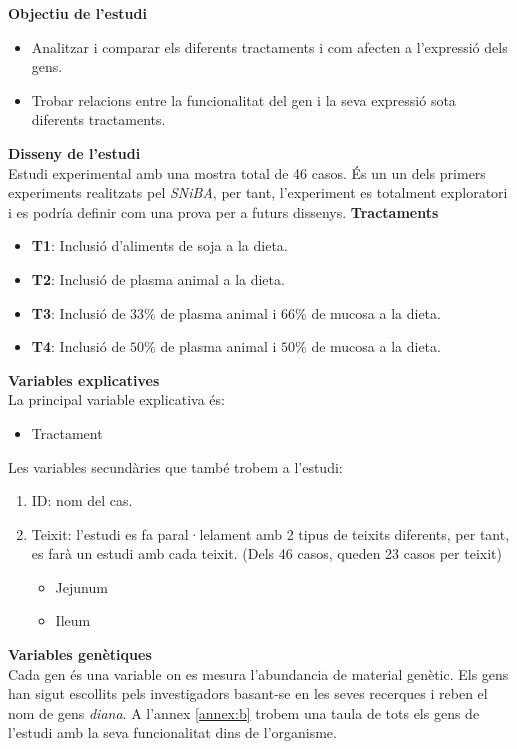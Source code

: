 \documentclass[english]{article}
\begin{document}
\noindent\textbf{Objectiu de l'estudi}
\begin{itemize}
  \item Analitzar i comparar els diferents tractaments i com afecten a l'expressió dels gens.
  \item Trobar relacions entre la funcionalitat del gen i la seva expressió sota diferents tractaments.
\end{itemize}
\noindent\textbf{Disseny de l'estudi}\\
Estudi experimental amb una mostra total de 46 casos. És un un dels primers experiments realitzats pel \textit{SNiBA}, per tant, l'experiment es totalment exploratori i es podría definir com una prova per a futurs dissenys.
\noindent\textbf{Tractaments}
\begin{itemize}
  \item \textbf{T1}: Inclusió d'aliments de soja a la dieta.
  \item \textbf{T2}: Inclusió de plasma animal a la dieta.
  \item \textbf{T3}: Inclusió de $33\%$ de plasma animal i  $66\%$ de mucosa a la dieta.
  \item \textbf{T4}: Inclusió de $50\%$ de plasma animal i  $50\%$ de mucosa a la dieta.
\end{itemize}
\noindent\textbf{Variables explicatives}\\
La principal variable explicativa és:
\begin{itemize}
  \item Tractament
\end{itemize}
Les variables secundàries que també trobem a l'estudi:
\begin{enumerate}
  \item ID: nom del cas.
  \item Teixit: l'estudi es fa paral·lelament amb 2 tipus de teixits diferents, per tant, es farà un estudi amb cada teixit. (Dels 46 casos, queden 23 casos per teixit)
  \begin{itemize}
    \item Jejunum
    \item Ileum
  \end{itemize}
\end{enumerate}
\noindent\textbf{Variables genètiques}\\
Cada gen és una variable on es mesura l'abundancia de material genètic. Els gens han sigut escollits pels investigadors basant-se en les seves recerques i reben el nom de gens \textit{diana}. A l'annex \ref{annex:b} trobem una taula de tots els gens de l'estudi amb la seva funcionalitat dins de l'organisme.
\end{document}
